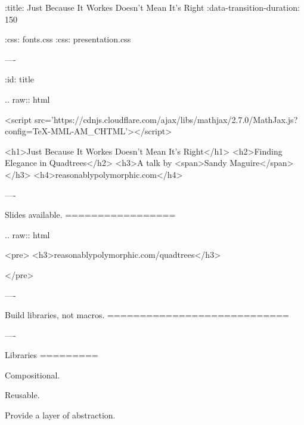 :title: Just Because It Workes Doesn't Mean It's Right
:data-transition-duration: 150

:css: fonts.css
:css: presentation.css


\newenvironment{table}{.. raw:: html

  <table>}{
  </table>
}

\newenvironment{hs}{.. code:: haskell
}{}
\newenvironment{raw}{.. raw:: html

  <pre>}{
  </pre>
}
\newenvironment{error}{.. raw:: html

  <pre class="error">}{    </pre>
}
\newenvironment{custom}{.. raw:: html

  <pre class="highlight code haskell">}{
  </pre>
}
\newcommand{\$}{\begin{verbatim}$\end{verbatim}}
\newcommand{\todo}[2]{#2}
\newcommand{\note}[1]{<span class="new">#1</span>}
\newcommand{\wat}[1]{<span class="wat">#1</span>}
\newcommand{\type}[1]{<span class="type">#1</span>}
\newcommand{\kind}[1]{<span class="kind">#1</span>}
\newcommand{\syn}[2]{<span class="#1">#2</span>}
\newcommand{\pragma}[1]{\{-# LANGUAGE #1 #-\}}
\newcommand{\pragmasyn}[1]{\syn{cm}{\{-# LANGUAGE #1 #-\}}}
\newcommand{\b}[1]{<pre class="highlight haskell code">#1</pre>}

----

:id: title

.. raw:: html

  <script src='https://cdnjs.cloudflare.com/ajax/libs/mathjax/2.7.0/MathJax.js?config=TeX-MML-AM_CHTML'></script>

  <h1>Just Because It Workes Doesn't Mean It's Right</h1>
  <h2>Finding Elegance in Quadtrees</h2>
  <h3>A talk by <span>Sandy Maguire</span></h3>
  <h4>reasonablypolymorphic.com</h4>

----

Slides available.
=================

\begin{raw}
  <h3>reasonablypolymorphic.com/quadtrees</h3>
\end{raw}

----

Build libraries, not macros.
============================

----

Libraries
=========

Compositional.

Reusable.

Provide a layer of abstraction.

